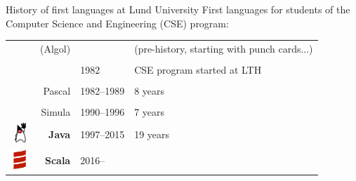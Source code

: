 \documentclass[aspectratio=169]{beamer}
\newenvironment{Slide}[1]%
  {\begin{frame}[environment=Slide]{#1}}
  {\end{frame}}%
\begin{document}
\begin{Slide}{History of first languages at Lund University}
First languages for students of the Computer Science and Engineering (CSE) program:
\begin{table}
\begin{tabular}{c r | l l}
     & (Algol) & & (pre-history, starting with punch cards...) \\ & & \\
     & & 1982  & CSE program started at LTH\\ &  & \\
&  { Pascal} & 1982--1989 & 8 years\\ &  & \\
&  { Simula} &  1990--1996 & 7 years \\
\includegraphics[height=2em]{Pictures/duke}    &  {\color{blue}\textbf{Java}} &  1997--2015 & 19 years \\
\includegraphics[height=2em]{Pictures/scala}   &  {\color{red}\textbf{Scala}} &  2016-- & \\
\end{tabular}
\end{table}

\end{Slide}
\end{document}
